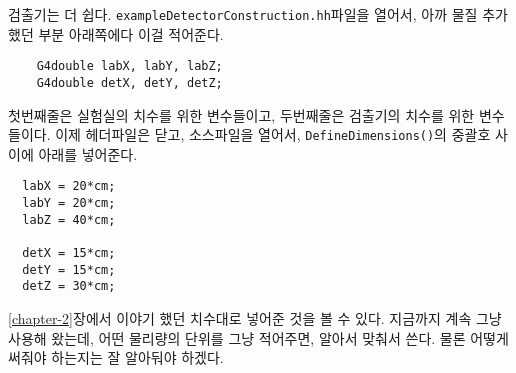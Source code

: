 검출기는 더 쉽다. \texttt{exampleDetectorConstruction.hh}파일을 열어서, 아까
물질 추가했던 부분 아래쪽에다 이걸 적어준다.
\begin{pc}
\begin{lstlisting}
    G4double labX, labY, labZ;
    G4double detX, detY, detZ;
\end{lstlisting}
\end{pc}
첫번째줄은 실험실의 치수를 위한 변수들이고, 두번째줄은 검출기의 치수를 위한
변수들이다. 이제 헤더파일은 닫고, 소스파일을
열어서, \texttt{DefineDimensions()}의 중괄호 사이에 아래를 넣어준다.
\begin{pc}
\begin{lstlisting}
  labX = 20*cm;
  labY = 20*cm;
  labZ = 40*cm;

  detX = 15*cm;
  detY = 15*cm;
  detZ = 30*cm;
\end{lstlisting}
\end{pc}
\ref{chapter-2}장에서 이야기 했던 치수대로 넣어준 것을 볼 수 있다. 지금까지
계속 그냥 사용해 왔는데, 어떤 물리량의 단위를 그냥 적어주면, 알아서 맞춰서
쓴다. 물론 어떻게 써줘야 하는지는 잘 알아둬야 하겠다.

